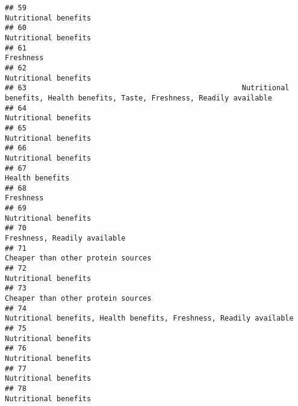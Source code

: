 \documentclass[
]{article}
\begin{document}
\begin{verbatim}
## 59                                                                                                        Nutritional benefits
## 60                                                                                                        Nutritional benefits
## 61                                                                                                                   Freshness
## 62                                                                                                        Nutritional benefits
## 63                                                  Nutritional benefits, Health benefits, Taste, Freshness, Readily available
## 64                                                                                                        Nutritional benefits
## 65                                                                                                        Nutritional benefits
## 66                                                                                                        Nutritional benefits
## 67                                                                                                             Health benefits
## 68                                                                                                                   Freshness
## 69                                                                                                        Nutritional benefits
## 70                                                                                                Freshness, Readily available
## 71                                                                                          Cheaper than other protein sources
## 72                                                                                                        Nutritional benefits
## 73                                                                                          Cheaper than other protein sources
## 74                                                         Nutritional benefits, Health benefits, Freshness, Readily available
## 75                                                                                                        Nutritional benefits
## 76                                                                                                        Nutritional benefits
## 77                                                                                                        Nutritional benefits
## 78                                                                                                        Nutritional benefits

\end{verbatim}
\end{document}
